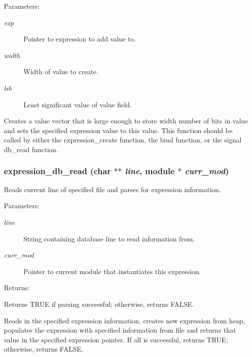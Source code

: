 \begin{Desc}
\item[Parameters: ]\par
\begin{description}
\item[{\em 
exp}]Pointer to expression to add value to. \item[{\em 
width}]Width of value to create. \item[{\em 
lsb}]Least significant value of value field.\end{description}
\end{Desc}
Creates a value vector that is large enough to store width number of bits in value and sets the specified expression value to this value. This function should be called by either the expression\_\-create function, the bind function, or the signal db\_\-read function. 
\subsubsection{ expression\_\-db\_\-read (char $\ast$$\ast$ {\em line}, {\bf module} $\ast$ {\em curr\_\-mod})}\label{expr_8h_a5}


Reads current line of specified file and parses for expression information.

\begin{Desc}
\item[Parameters: ]\par
\begin{description}
\item[{\em 
line}]String containing database line to read information from. \item[{\em 
curr\_\-mod}]Pointer to current module that instantiates this expression.\end{description}
\end{Desc}
\begin{Desc}
\item[Returns: ]\par
Returns TRUE if parsing successful; otherwise, returns FALSE.\end{Desc}
Reads in the specified expression information, creates new expression from heap, populates the expression with specified information from file and  returns that value in the specified expression pointer. If all is  successful, returns TRUE; otherwise, returns FALSE. 
